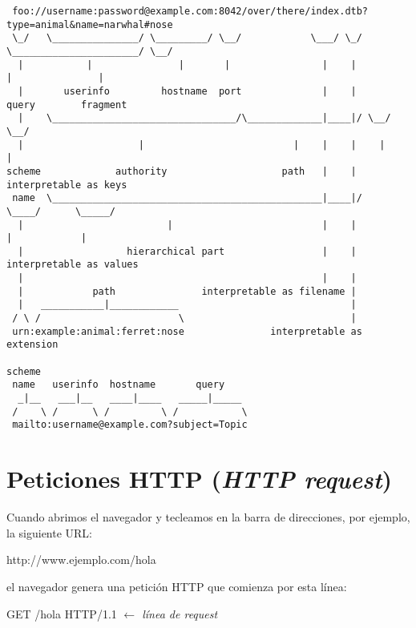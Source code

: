 \documentclass[a4paper,11pt]{memoir}
\begin{document}
\begin{tcolorbox}[float=htb,enhanced,left=0mm,right=0mm,oversize,drop fuzzy shadow,adjusted title=Partes de una URL]
\scriptsize
\begin{verbatim}
 foo://username:password@example.com:8042/over/there/index.dtb?type=animal&name=narwhal#nose
 \_/   \_______________/ \_________/ \__/            \___/ \_/ \______________________/ \__/
  |           |               |       |                |    |            |               |
  |       userinfo         hostname  port              |    |          query        fragment
  |    \________________________________/\_____________|____|/ \__/        \__/
  |                    |                          |    |    |    |          |
scheme             authority                    path   |    |    interpretable as keys
 name  \_______________________________________________|____|/      \____/      \_____/
  |                         |                          |    |         |            |
  |                  hierarchical part                 |    |    interpretable as values
  |                                                    |    |
  |            path               interpretable as filename |
  |   ___________|____________                              |
 / \ /                        \                             |
 urn:example:animal:ferret:nose               interpretable as extension

scheme
 name   userinfo  hostname       query
  _|__   ___|__   ____|____   _____|_____
 /    \ /      \ /         \ /           \
 mailto:username@example.com?subject=Topic
\end{verbatim}
\end{tcolorbox}

\section{Peticiones HTTP (\emph{HTTP request})}

Cuando abrimos el navegador y tecleamos en la barra de direcciones,
por ejemplo, la siguiente URL:

\begin{codigo}
http://www.ejemplo.com/hola
\end{codigo}

el navegador genera una petición HTTP que comienza por esta línea:

\begin{codigo}
GET /hola HTTP/1.1          \emph{\(\leftarrow\) línea de request}
\end{codigo}
\end{document}
